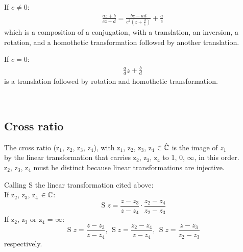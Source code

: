If $c\neq0:$
\begin{gather*}
    \frac{az+b}{cz+d} = \frac{bc-ad}{c^2(z+\frac{d}{c})} + \frac{a}{c}
\end{gather*}
which is a composition of a conjugation, with a translation, an inversion, a rotation, and a homothetic transformation followed by another translation.

If $c=0:$
\begin{gather*}
    \frac{a}{d}z + \frac{b}{d}
\end{gather*}
is a translation followed by rotation and homothetic transformation.

\begin{fato}
\\
\end{fato}


\subsection{Cross ratio} \label{cross}
\begin{definicao}
The cross ratio (z$_1$, z$_2$, z$_3$, z$_4$), with z$_1$, z$_2$, z$_3$, z$_4$ $\in \hat{\mathbb{C}}$ is the image of $z_1$\\
by the linear transformation that carries z$_2$, z$_3$, z$_4$ to 1, 0, $\infty$, in this order.\\
z$_2$, z$_3$, z$_4$ must be distinct because linear transformations are injective.
\end{definicao}

\begin{fato}
Calling S the linear transformation cited above:\\
If z$_2$, z$_3$, z$_4$ $\in \mathbb{C}$:\\
\begin{equation*}
    \operatorname{S}z=\frac{z-z_3}{z-z_4} \cdot \frac{z_2-z_4}{z_2-z_3}
\end{equation*}
If z$_2$, z$_3$ or z$_4$ = $\infty$:\\
\begin{equation*}
    \operatorname{S}z = \frac{z - z_3}{z - z_4} \text{, } \operatorname{S}z = \frac{z_2 - z_4}{z - z_4} \text{, } \operatorname{S}z = \frac{z - z_3}{z_2 - z_3}
\end{equation*}
respectively.
\end{fato}

